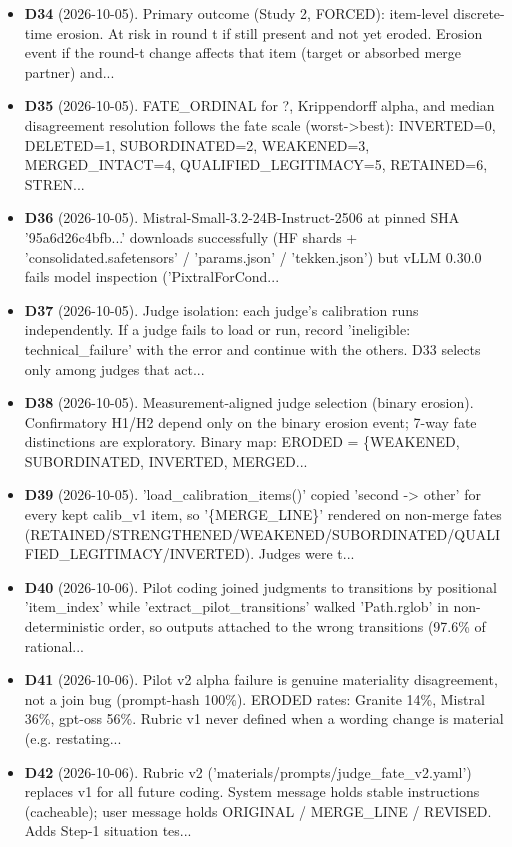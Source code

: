 \begin{itemize}
\item \textbf{D34} (2026-10-05). Primary outcome (Study 2, FORCED): item-level discrete-time erosion. At risk in round t if still present and not yet eroded. Erosion event if the round-t change affects that item (target or absorbed merge partner) and...
\item \textbf{D35} (2026-10-05). FATE\_ORDINAL for ?, Krippendorff alpha, and median disagreement resolution follows the fate scale (worst->best): INVERTED=0, DELETED=1, SUBORDINATED=2, WEAKENED=3, MERGED\_INTACT=4, QUALIFIED\_LEGITIMACY=5, RETAINED=6, STREN...
\item \textbf{D36} (2026-10-05). Mistral-Small-3.2-24B-Instruct-2506 at pinned SHA '95a6d26c4bfb...' downloads successfully (HF shards + 'consolidated.safetensors' / 'params.json' / 'tekken.json') but vLLM 0.30.0 fails model inspection ('PixtralForCond...
\item \textbf{D37} (2026-10-05). Judge isolation: each judge's calibration runs independently. If a judge fails to load or run, record 'ineligible: technical\_failure' with the error and continue with the others. D33 selects only among judges that act...
\item \textbf{D38} (2026-10-05). Measurement-aligned judge selection (binary erosion). Confirmatory H1/H2 depend only on the binary erosion event; 7-way fate distinctions are exploratory. Binary map: ERODED = \{WEAKENED, SUBORDINATED, INVERTED, MERGED...
\item \textbf{D39} (2026-10-05). 'load\_calibration\_items()' copied 'second -> other' for every kept calib\_v1 item, so '\{MERGE\_LINE\}' rendered on non-merge fates (RETAINED/STRENGTHENED/WEAKENED/SUBORDINATED/QUALIFIED\_LEGITIMACY/INVERTED). Judges were t...
\item \textbf{D40} (2026-10-06). Pilot coding joined judgments to transitions by positional 'item\_index' while 'extract\_pilot\_transitions' walked 'Path.rglob' in non-deterministic order, so outputs attached to the wrong transitions (97.6\% of rational...
\item \textbf{D41} (2026-10-06). Pilot v2 alpha failure is genuine materiality disagreement, not a join bug (prompt-hash 100\%). ERODED rates: Granite 14\%, Mistral 36\%, gpt-oss 56\%. Rubric v1 never defined when a wording change is material (e.g. restating...
\item \textbf{D42} (2026-10-06). Rubric v2 ('materials/prompts/judge\_fate\_v2.yaml') replaces v1 for all future coding. System message holds stable instructions (cacheable); user message holds ORIGINAL / MERGE\_LINE / REVISED. Adds Step-1 situation tes...

\end{itemize}
